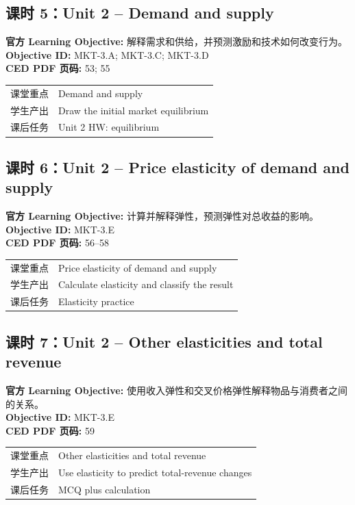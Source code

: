 \documentclass[11pt,a4paper]{ctexart}
\newcommand{\objectivebox}[1]{\noindent\colorbox{aplight}{\parbox{0.96\textwidth}{#1}}}
\begin{document}
\subsection{课时 5：Unit 2 -- Demand and supply}
\objectivebox{\textbf{官方 Learning Objective:} 解释需求和供给，并预测激励和技术如何改变行为。\\\textbf{Objective ID:} MKT-3.A; MKT-3.C; MKT-3.D\\\textbf{CED PDF 页码:} 53; 55}\par\vspace{0.4em}
\begin{tabularx}{\textwidth}{p{3.0cm}Y}
\toprule
课堂重点 & Demand and supply\\
学生产出 & Draw the initial market equilibrium\\
课后任务 & Unit 2 HW: equilibrium\\
\bottomrule
\end{tabularx}
\subsection{课时 6：Unit 2 -- Price elasticity of demand and supply}
\objectivebox{\textbf{官方 Learning Objective:} 计算并解释弹性，预测弹性对总收益的影响。\\\textbf{Objective ID:} MKT-3.E\\\textbf{CED PDF 页码:} 56–58}\par\vspace{0.4em}
\begin{tabularx}{\textwidth}{p{3.0cm}Y}
\toprule
课堂重点 & Price elasticity of demand and supply\\
学生产出 & Calculate elasticity and classify the result\\
课后任务 & Elasticity practice\\
\bottomrule
\end{tabularx}
\newpage
\subsection{课时 7：Unit 2 -- Other elasticities and total revenue}
\objectivebox{\textbf{官方 Learning Objective:} 使用收入弹性和交叉价格弹性解释物品与消费者之间的关系。\\\textbf{Objective ID:} MKT-3.E\\\textbf{CED PDF 页码:} 59}\par\vspace{0.4em}
\begin{tabularx}{\textwidth}{p{3.0cm}Y}
\toprule
课堂重点 & Other elasticities and total revenue\\
学生产出 & Use elasticity to predict total-revenue changes\\
课后任务 & MCQ plus calculation\\
\bottomrule
\end{tabularx}
\end{document}
